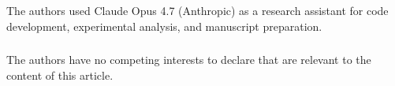 \documentclass[runningheads]{llncs}
\begin{document}






\begin{credits}
\subsubsection{\ackname} The authors used Claude Opus 4.7 (Anthropic) as a research assistant for code development, experimental analysis, and manuscript preparation.

\subsubsection{\discintname}
The authors have no competing interests to declare that are relevant to the content of this article.
\end{credits}

\makeatletter
\renewcommand\@biblabel[1]{#1.}
\let\oldbibliography\thebibliography
\renewcommand{\thebibliography}[1]{%
 \oldbibliography{#1}%
 \footnotesize
 \setlength{\itemsep}{0pt}%
 \setlength{\parsep}{0pt}%
}
\makeatother

\enlargethispage{6\baselineskip}
{\footnotesize}
\end{document}
